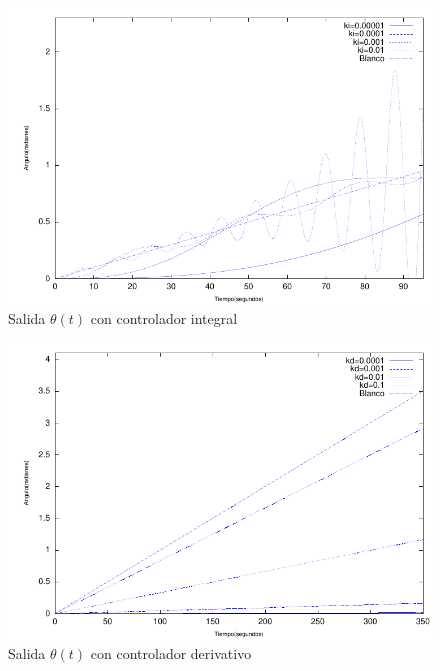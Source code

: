 \documentclass{sig-alternate}
\begin{document}
\begin{figure}[hp]
\label{mIntegral}
\centering
\includegraphics[scale=0.8]{graficos/mIntegral}
\caption{Salida $\theta(t)$ con controlador integral}
\end{figure}

\begin{figure}[hp]
\label{mDerivativo}
\centering
\includegraphics[scale=0.8]{graficos/mDerivativo}
\caption{Salida $\theta(t)$ con controlador derivativo}
\end{figure}
\end{document}
